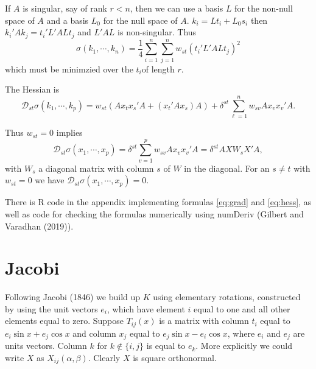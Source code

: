 \documentclass[
  12pt,
]{article}
\begin{document}
If \(A\) is singular, say of rank \(r<n\), then we can use a basis \(L\) for the non-null space of \(A\)
and a basis \(L_0\) for the null space of \(A\). \(k_i=Lt_i+L_0s_i\)
then \(k_i'Ak_j=t_i'L'ALt_j\) and \(L'AL\) is non-singular. Thus
\[
\sigma(k_1,\cdots,k_n)=\frac14\sum_{i=1}^n\sum_{j=1}^n w_{st}(t_i'L'ALt_j)^2
\]
which must be minimzied over the \(t_i\)of length \(r\).

The Hessian is
\begin{equation}
\mathcal{D}_{st}\sigma(k_1,\cdots,k_p)
=w_{st}(Ax_tx_s'A+(x_t'Ax_s)A)+\delta^{st}\sum_{\ell=1}^nw_{sv}Ax_vx_v'A.
\label{eq:hess}
\end{equation}

Thus \(w_{st}=0\) implies
\begin{equation}
\mathcal{D}_{st}\sigma(x_1,\cdots,x_p)
=\delta^{st}\sum_{v=1}^pw_{sv}Ax_vx_v'A=\delta^{st}AXW_sX'A,
\label{eq:hessholl}
\end{equation}
with \(W_s\) a diagonal matrix with column \(s\) of \(W\) in the diagonal. For an
\(s\not= t\) with \(w_{st}=0\) we have \(\mathcal{D}_{st}\sigma(x_1,\cdots,x_p)=0\).

There is R code in the appendix implementing formulas \eqref{eq:grad} and \eqref{eq:hess}, as well as
code for checking the formulas numerically using numDeriv (Gilbert and Varadhan (2019)).

\section{Jacobi}\label{jacobi}

Following Jacobi (1846) we build up \(K\) using elementary rotations, constructed by using the unit vectors
\(e_i\), which have element \(i\) equal to one and all other elements equal to zero.
Suppose \(T_{ij}(x)\) is a matrix with column \(t_i\) equal to \(e_i\sin x+e_j\cos x\) and column \(x_j\) equal to \(e_j\sin x-e_i\cos x\), where \(e_i\) and \(e_j\) are units vectors. Column \(k\) for \(k\not\in\{i, j\}\) is equal to \(e_k\). More explicitly we could write \(X\) as \(X_{ij}(\alpha,\beta)\). Clearly \(X\) is square orthonormal.
\end{document}
